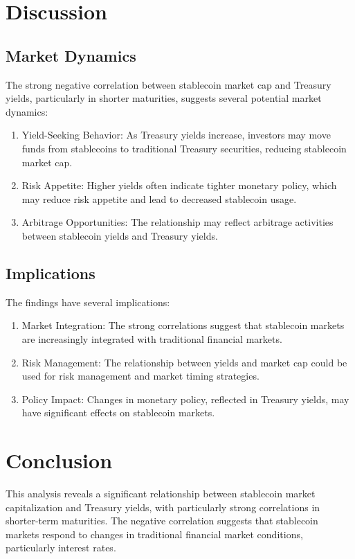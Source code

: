 \documentclass[12pt,a4paper]{article}
\begin{document}
\section{Discussion}

\subsection{Market Dynamics}
The strong negative correlation between stablecoin market cap and Treasury yields, particularly in shorter maturities, suggests several potential market dynamics:

\begin{enumerate}
    \item Yield-Seeking Behavior: As Treasury yields increase, investors may move funds from stablecoins to traditional Treasury securities, reducing stablecoin market cap.
    
    \item Risk Appetite: Higher yields often indicate tighter monetary policy, which may reduce risk appetite and lead to decreased stablecoin usage.
    
    \item Arbitrage Opportunities: The relationship may reflect arbitrage activities between stablecoin yields and Treasury yields.
\end{enumerate}

\subsection{Implications}
The findings have several implications:

\begin{enumerate}
    \item Market Integration: The strong correlations suggest that stablecoin markets are increasingly integrated with traditional financial markets.
    
    \item Risk Management: The relationship between yields and market cap could be used for risk management and market timing strategies.
    
    \item Policy Impact: Changes in monetary policy, reflected in Treasury yields, may have significant effects on stablecoin markets.
\end{enumerate}

\section{Conclusion}
This analysis reveals a significant relationship between stablecoin market capitalization and Treasury yields, with particularly strong correlations in shorter-term maturities. The negative correlation suggests that stablecoin markets respond to changes in traditional financial market conditions, particularly interest rates.
\end{document}
